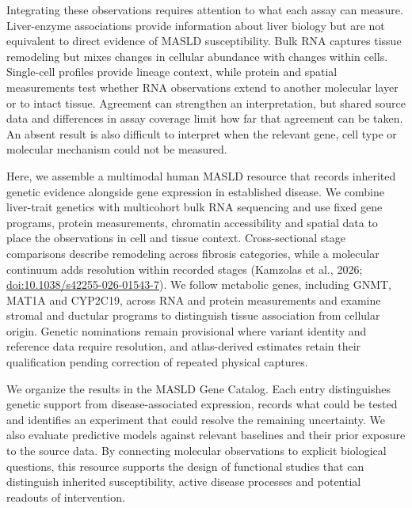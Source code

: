 Integrating these observations requires attention to what each assay can measure. Liver-enzyme associations provide information about liver biology but are not equivalent to direct evidence of MASLD susceptibility. Bulk RNA captures tissue remodeling but mixes changes in cellular abundance with changes within cells. Single-cell profiles provide lineage context, while protein and spatial measurements test whether RNA observations extend to another molecular layer or to intact tissue. Agreement can strengthen an interpretation, but shared source data and differences in assay coverage limit how far that agreement can be taken. An absent result is also difficult to interpret when the relevant gene, cell type or molecular mechanism could not be measured.

Here, we assemble a multimodal human MASLD resource that records inherited genetic evidence alongside gene expression in established disease. We combine liver-trait genetics with multicohort bulk RNA sequencing and use fixed gene programs, protein measurements, chromatin accessibility and spatial data to place the observations in cell and tissue context. Cross-sectional stage comparisons describe remodeling across fibrosis categories, while a molecular continuum adds resolution within recorded stages (Kamzolas et al., 2026; \url{doi:10.1038/s42255-026-01543-7}). We follow metabolic genes, including GNMT, MAT1A and CYP2C19, across RNA and protein measurements and examine stromal and ductular programs to distinguish tissue association from cellular origin. Genetic nominations remain provisional where variant identity and reference data require resolution, and atlas-derived estimates retain their qualification pending correction of repeated physical captures.

We organize the results in the MASLD Gene Catalog. Each entry distinguishes genetic support from disease-associated expression, records what could be tested and identifies an experiment that could resolve the remaining uncertainty. We also evaluate predictive models against relevant baselines and their prior exposure to the source data. By connecting molecular observations to explicit biological questions, this resource supports the design of functional studies that can distinguish inherited susceptibility, active disease processes and potential readouts of intervention.
